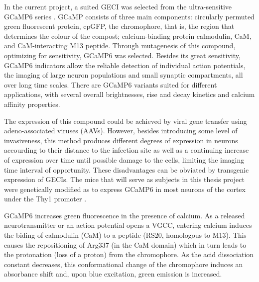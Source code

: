 In the current project, a suited GECI was selected from the ultra-sensitive GCaMP6 series \cite{GCAMP6}. GCaMP consists of three main components: circularly permuted green fluorescent protein, cpGFP, the chromophore, that is, the region that determines the colour of the compost; calcium-binding protein calmodulin, CaM, and CaM-interacting M13 peptide. Through mutagenesis of this compound, optimizing for sensitivity, GCaMP6 was selected. Besides its great sensitivity, GCaMP6 indicators allow the reliable detection of individual action potentials, the imaging of large neuron populations and small synaptic compartments, all over long time scales. There are GCaMP6 variants suited for different applications, with several overall brightnesses, rise and decay kinetics and calcium affinity properties.

The expression of this compound could be achieved by viral gene transfer using adeno-associated viruses (AAVs). However, besides introducing some level of invasiveness, this method produces different degrees of expression in neurons accourding to their distance to the infection site as well as a continuing increase of expression over time until possible damage to the cells, limiting the imaging time interval of opportunity. These disadvantages can be obviated by transgenic expression of GECIs. The mice that will serve as subjects in this thesis project were genetically modified as to express GCaMP6 in most neurons of the cortex under the Thy1 promoter \cite{Transgenic}. 

GCaMP6 increases green fluorescence in the presence of calcium. As a released neurotransmitter or an action potential opens a VGCC, entering calcium induces the biding of calmodulin (CaM) to a peptide (RS20, homologous to M13). This causes the repositioning of Arg337 (in the CaM domain) which in turn leads to the protonation (loss of a proton) from the chromophore. As the acid dissociation constant decreases, %
this conformational change of the chromophore induces an absorbance shift and, upon blue excitation, green emission is increased.


